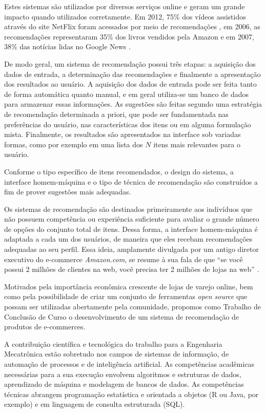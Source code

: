 Estes sistemas são utilizados por diversos serviços online e geram um grande impacto quando utilizados corretamente. Em 2012, 75\% dos vídeos assistidos através do site NetFlix foram acessados por meio de recomendações \cite{netflix75}, em 2006, as recomendações representaram 35\% dos livros vendidos pela Amazon \cite{amazon35} e em 2007, 38\% das notícias lidas no Google News \cite{das2007google}.

De modo geral, um sistema de recomendação possui três etapas: a aquisição dos dados de entrada, a determinação das recomendações e finalmente a apresentação dos resultados ao usuário. A aquisição dos dados de entrada pode ser feita tanto de forma automática quanto manual, e em geral utiliza-se um banco de dados para armazenar essas informações. As sugestões são feitas segundo uma estratégia de recomendação determinada a priori, que pode ser fundamentada nas preferências do usuário, nas características dos itens ou em alguma formulação mista. Finalmente, os resultados são apresentados na interface sob variadas formas, como por exemplo em uma lista dos $N$ itens mais relevantes para o usuário.   

Conforme o tipo específico de itens recomendados, o design do sistema, a interface homem-máquina e o tipo de técnica de recomendação são construídos a fim de prover sugestões mais adequadas.

Os sistemas de recomendação são destinados primeiramente aos indivíduos que não possuem competência ou experiência suficiente para avaliar o grande número de opções do conjunto total de itens. Dessa forma, a interface homem-máquina é adaptada a cada um dos usuários, de maneira que eles recebam recomendações adequadas ao seu perfil. Essa ideia, amplamente divulgada por um antigo diretor executivo do e-commerce \textit{Amazon.com}, se resume à sua fala de que ``se você possui 2 milhões de clientes na web, você precisa ter 2 milhões de lojas na web'' \cite{schafer1999recommender}. 

Motivados pela importância econômica crescente de lojas de varejo online, bem como pela possibilidade de criar um conjunto de ferramentas \textit{open source} que possam ser utilizadas abertamente pela comunidade, propomos como Trabalho de Conclusão de Curso o desenvolvimento de um sistema de recomendação de produtos de e-commerces.  

A contribuição científica e tecnológica do trabalho para a Engenharia Mecatrônica estão sobretudo nos campos de sistemas de informação, de automação de processos e de inteligência artificial. As competências acadêmicas necessárias para a sua execução envolvem algoritmos e estruturas de dados, aprendizado de máquina e modelagem de bancos de dados. As competências técnicas abrangem programação estatística e orientada a objetos (R ou Java, por exemplo) e em linguagem de consulta estruturada (SQL).